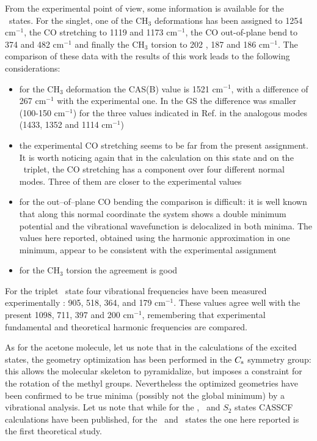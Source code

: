 From the experimental point of view, some information is available for the
\npi\ states.  For the singlet, one of the CH$_3$ deformations has been
assigned \cite{cp-93-425-1985} to 1254 cm$^{-1}$, the CO stretching to 1119
\cite{jacs-103-3313-1981} and 1173 \cite{cp-93-425-1985} cm$^{-1}$, the CO
out-of-plane bend to 374 \cite{jcp-81-1632-1984} and 482
\cite{cp-93-425-1985} cm$^{-1}$ and finally the CH$_3$ torsion to 202
\cite{jpc-97-7194-1993}, 187 \cite{jacs-103-3313-1981} and 186
\cite{jcp-78-2219-1983} cm$^{-1}$. The comparison of these data with the
results of this work leads to the following considerations:
\begin{itemize}
\item for the CH$_3$ deformation the CAS(B) value is 1521 cm$^{-1}$, with a
difference of 267 cm$^{-1}$ with the experimental one. In the GS the
difference was smaller (100-150 cm$^{-1}$) for the three values indicated
in Ref.  in the  analogous modes (1433, 1352 and 1114
cm$^{-1}$)
\item the experimental CO stretching seems to be far from the
present assignment.  It is worth noticing again that in the calculation on
this state and on the \npi\ triplet, the CO stretching has a component over
four different normal modes. Three of them are closer to the experimental
values
\item for the out--of--plane CO bending the comparison is difficult: it is
well known that along this normal coordinate the system shows a double
minimum potential and the vibrational wavefunction is delocalized in both
minima. The values here reported, obtained using the harmonic approximation
in one minimum, appear to be consistent with the experimental assignment
\item for the CH$_3$ torsion the agreement is good
\end{itemize}

For the triplet \npi\ state four vibrational frequencies have been measured
experimentally \cite{cjc-70-931-1992}: 905, 518, 364, and 179 cm$^{-1}$.
These values agree well with the present 1098, 711, 397 and 200 cm$^{-1}$,
remembering that experimental fundamental and theoretical harmonic
frequencies are compared.

As for the acetone molecule, let us note that in the calculations of the
excited states, the geometry optimization has been performed in the $C_{\rm
s}$ symmetry group: this allows the molecular skeleton to pyramidalize, but
imposes a constraint for the rotation of the methyl groups. Nevertheless the
optimized geometries have been confirmed to be true minima (possibly not the
global minimum) by a vibrational analysis. Let us note that while for the
\snpi, \tnpi\ and $S_2$ states CASSCF calculations have been published, for
the \tpipi\ and \tspi\ states the one here reported is the first theoretical
study.

